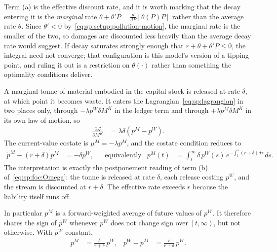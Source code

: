 Term (a) is the effective discount rate, and it is worth marking that the decay entering it is the \emph{marginal} rate $\theta+\theta'P=\tfrac{d}{dP}\left[\theta\left(P\right)P\right]$ rather than the average rate $\theta$. Since $\theta'<0$ by~\eqref{eq:sp:setup:pollution-motion}, the marginal rate is the smaller of the two, so damages are discounted less heavily than the average decay rate would suggest. If decay saturates strongly enough that $r+\theta+\theta'P\le0$, the integral need not converge; that configuration is this model's version of a tipping point, and ruling it out is a restriction on $\theta\left(\cdot\right)$ rather than something the optimality conditions deliver.

 A marginal tonne of material embodied in the capital stock is released at rate $\delta$, at which point it becomes waste. It enters the Lagrangian~\eqref{eq:sp:lagrangian} in two places only, through $-\lambda p^W\delta M^K$ in the ledger term and through $+\lambda p^M\delta M^K$ in its own law of motion, so
\begin{align*}
\frac{\partial\mathcal L}{\partial M^K} &= \lambda\delta\left(p^M-p^W\right).
\end{align*}
The current-value costate is $\mu^M=-\lambda p^M$, and the costate condition reduces to
\begin{align}
\dot p^M-\left(r+\delta\right)p^M &= -\delta p^W,
&&\text{equivalently}
&
p^M(t) &= \int_t^\infty \delta\,p^W(s)\,e^{-\int_t^s\left(r+\delta\right)d\tau}\,ds .
\label{eq:sp:costate:M}
\end{align}
The interpretation is exactly the postponement reading of term (b) of~\eqref{eq:sp:foc:Omega}: the tonne is released at rate $\delta$, each release costing $p^W$, and the stream is discounted at $r+\delta$. The effective rate exceeds $r$ because the liability itself runs off.

In particular $p^M$ is a forward-weighted average of future values of $p^W$. It therefore shares the sign of $p^W$ whenever $p^W$ does not change sign over $\left[t,\infty\right)$, but not otherwise. With $p^W$ constant,
\begin{align}
p^M &= \frac{\delta}{r+\delta}\,p^W,
&
p^W-p^M &= \frac{r}{r+\delta}\,p^W .
\label{eq:sp:costate:M-steady}
\end{align}

